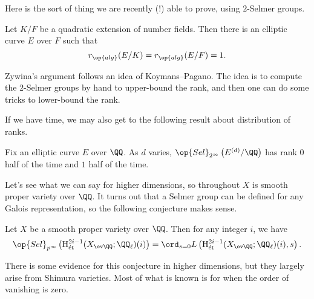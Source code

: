 \documentclass[../notes.tex]{subfiles}
\begin{document}
Here is the sort of thing we are recently (!) able to prove, using $2$-Selmer groups.
\begin{theorem}[Zywina] \label{thm:zywina-koymans-pagano}
	Let $K/F$ be a quadratic extension of number fields. Then there is an elliptic curve $E$ over $F$ such that
	\[r_{\op{alg}}(E/K)=r_{\op{alg}}(E/F)=1.\]
\end{theorem}
\begin{remark}
	Zywina's argument follows an idea of Koymans--Pagano. The idea is to compute the $2$-Selmer groups by hand to upper-bound the rank, and then one can do some tricks to lower-bound the rank.
\end{remark}
If we have time, we may also get to the following result about distribution of ranks.
\begin{theorem}[Smith]
	Fix an elliptic curve $E$ over $\QQ$. As $d$ varies, $\op{Sel}_{2^\infty}\left(E^{(d)}/\QQ\right)$ has rank $0$ half of the time and $1$ half of the time.
\end{theorem}
Let's see what we can say for higher dimensions, so throughout $X$ is smooth proper variety over $\QQ$. It turns out that a Selmer group can be defined for any Galois representation, so the following conjecture makes sense.
\begin{conj}
	Let $X$ be a smooth proper variety over $\QQ$. Then for any integer $i$, we have
	\[\op{Sel}_{p^\infty}\left(\mathrm H^{2i-1}_{\mathrm{\acute et}}(X_{\ov\QQ};\QQ_\ell)(i)\right)=\ord_{s=0}L\left(\mathrm H^{2i-1}_{\mathrm{\acute et}}(X_{\ov\QQ};\QQ_\ell)(i),s\right).\]
\end{conj}
There is some evidence for this conjecture in higher dimensions, but they largely arise from Shimura varieties. Most of what is known is for when the order of vanishing is zero.
\end{document}
